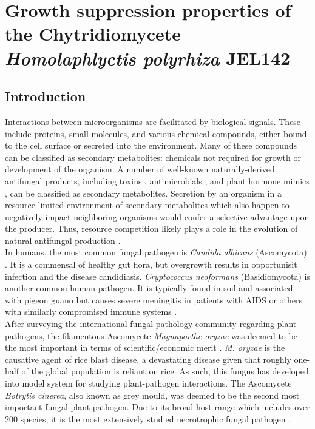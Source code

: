 \chapter{Growth suppression properties of the Chytridiomycete \textit{Homolaphlyctis polyrhiza} JEL142}
\label{chap:HpInhibition}
\section{Introduction}
Interactions between microorganisms are facilitated by biological signals. These include proteins, small molecules, and various chemical compounds, either bound to the cell surface or secreted into the environment. Many of these compounds can be classified as secondary metabolites: chemicals not required for growth or development of the organism. A number of well-known naturally-derived antifungal products, including toxins \cite{Kokkonen2010}, antimicrobials \cite{Wiemann2014}, and plant hormone mimics \cite{Howlett2006}, can be classified as secondary metabolites. Secretion by an organism in a resource-limited environment of secondary metabolites which also happen to negatively impact neighboring organisms would confer a selective advantage upon the producer. Thus, resource competition likely plays a role in the evolution of natural antifungal production \cite{Vicente2003}.\\
\indent In humans, the most common fungal pathogen is \textit{Candida albicans} (Ascomycota) \cite{Sherris1994}. It is a commensal of healthy gut flora, but overgrowth results in opportunisit infection and the disease candidiasis. \textit{Cryptococcus neoformans} (Basidiomycota) is another common human pathogen. It is typically found in soil and associated with pigeon guano but causes severe meningitis in patients with AIDS or others with similarly compromised immune systems \cite{Casadevall2013}.\\
\indent After surveying the international fungal pathology community regarding plant pathogens, the filamentous Ascomycete \textit{Magnaporthe oryzae} was deemed to be the most important in terms of scientific/economic merit \cite{Dean2012}. \textit{M. oryzae} is the causative agent of rice blast disease, a devastating disease given that roughly one-half of the global population is reliant on rice. As such, this fungus has developed into model system for studying plant-pathogen interactions. The Ascomycete \textit{Botrytis cinerea}, also known as grey mould, was deemed to be the second most important fungal plant pathogen. Due to its broad host range which includes over 200 species, it is the most extensively studied necrotrophic fungal pathogen \cite{Dean2012}.\\
